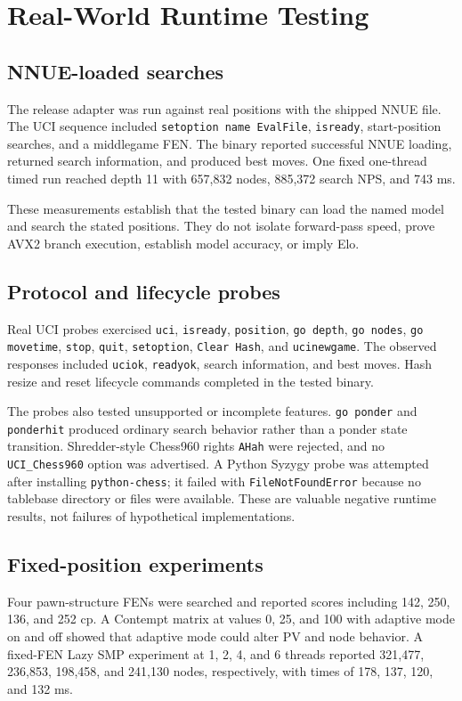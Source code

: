 \documentclass[conference]{IEEEtran}
\newcommand{\code}[1]{\texttt{\small #1}}
\begin{document}
\section{Real-World Runtime Testing}
\subsection{NNUE-loaded searches}
The release adapter was run against real positions with the shipped NNUE file. The UCI sequence included \code{setoption name EvalFile}, \code{isready}, start-position searches, and a middlegame FEN. The binary reported successful NNUE loading, returned search information, and produced best moves. One fixed one-thread timed run reached depth 11 with 657,832 nodes, 885,372 search NPS, and 743 ms.

These measurements establish that the tested binary can load the named model and search the stated positions. They do not isolate forward-pass speed, prove AVX2 branch execution, establish model accuracy, or imply Elo.

\subsection{Protocol and lifecycle probes}
Real UCI probes exercised \code{uci}, \code{isready}, \code{position}, \code{go depth}, \code{go nodes}, \code{go movetime}, \code{stop}, \code{quit}, \code{setoption}, \code{Clear Hash}, and \code{ucinewgame}. The observed responses included \code{uciok}, \code{readyok}, search information, and best moves. Hash resize and reset lifecycle commands completed in the tested binary.

The probes also tested unsupported or incomplete features. \code{go ponder} and \code{ponderhit} produced ordinary search behavior rather than a ponder state transition. Shredder-style Chess960 rights \code{AHah} were rejected, and no \code{UCI\_Chess960} option was advertised. A Python Syzygy probe was attempted after installing \code{python-chess}; it failed with \code{FileNotFoundError} because no tablebase directory or files were available. These are valuable negative runtime results, not failures of hypothetical implementations.

\subsection{Fixed-position experiments}
Four pawn-structure FENs were searched and reported scores including 142, 250, 136, and 252 cp. A Contempt matrix at values 0, 25, and 100 with adaptive mode on and off showed that adaptive mode could alter PV and node behavior. A fixed-FEN Lazy SMP experiment at 1, 2, 4, and 6 threads reported 321,477, 236,853, 198,458, and 241,130 nodes, respectively, with times of 178, 137, 120, and 132 ms.
\end{document}

